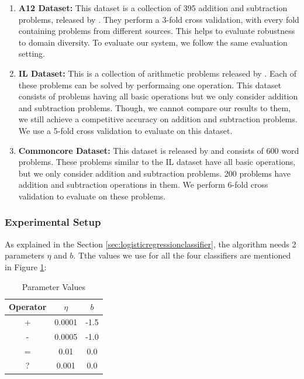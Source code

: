 \documentclass[11pt]{article}
\begin{document}
\begin{enumerate}
\item \textbf{A12 Dataset:} This dataset is a collection of 395 addition and subtraction problems, released by \citep{ARIS}. They perform a 3-fold cross validation, with every fold containing problems from different sources. This helps to evaluate robustness to domain diversity. To evaluate our system, we follow the same evaluation setting.

\item \textbf{IL Dataset:} This is a collection of arithmetic problems released by \citep{RoyTACL15}. Each of these problems can be solved by performaing one operation. This dataset consists of problems having all basic operations but we only consider addition and subtraction problems. Though, we cannot compare our results to them, we still achieve a competitive accuracy on addition and subtraction problems. We use a 5-fold cross validation to evaluate on this dataset.

\item \textbf{Commoncore Dataset:} This dataset is released by \citep{RoyR15} and consists of 600 word problems. These problems similar to the IL dataset have all basic operations, but we only consider addition and subtraction problems. 200 problems have addition and subtraction operations in them. We perform 6-fold cross validation to evaluate on these problems.
\end{enumerate}


\subsubsection{Experimental Setup}\label{sec:experimentalsetup}
As explained in the Section \ref{sec:logisticregressionclassifier}, the algorithm needs 2 parameters \begin{math}\eta\end{math} and \begin{math}b\end{math}. Tthe values we use for all the four classifiers are mentioned in Figure \ref{figure:23}:

\begin{table}[h]
\begin{center}
\begin{tabular}{|c|c|c|}
\hline
\textbf{Operator} & \begin{math}\eta\end{math} & \begin{math}b\end{math} \\
\hline
+ & 0.0001 & -1.5 \\
\hline
- & 0.0005 & -1.0\\
\hline
= & 0.01 & 0.0\\
\hline
? & 0.001 & 0.0\\
\hline
\end{tabular}
\end{center}
\caption{Parameter Values}
\label{figure:23}
\end{table}
\end{document}
